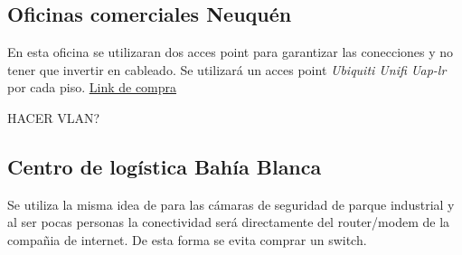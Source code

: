 \documentclass[11pt]{article}
\begin{document}
    \subsection*{Oficinas comerciales Neuquén}

    En esta oficina se utilizaran dos acces point para garantizar las conecciones y no tener que invertir en cableado. Se utilizará un acces point \textit{Ubiquiti Unifi Uap-lr} por cada piso.
    \href{https://www.mercadolibre.com.ar/access-point-interior-ubiquiti-networks-unifi-ac-lr-ap-uap-ac-lr-blanco-1-unidad/p/MLA7953376?pdp_filters=category:MLA1700#searchVariation=MLA7953376&position=1&type=product&tracking_id=933ff74a-93c5-4a58-9a31-9fe5a3c5746e}{Link de compra}
    
    HACER VLAN?

    \subsection*{Centro de logística Bahía Blanca}
    Se utiliza la misma idea de para las cámaras de seguridad de parque industrial y al ser pocas personas la conectividad será directamente del router/modem 
    de la compañia de internet. De esta forma se evita comprar un switch. 

    
\end{document}
